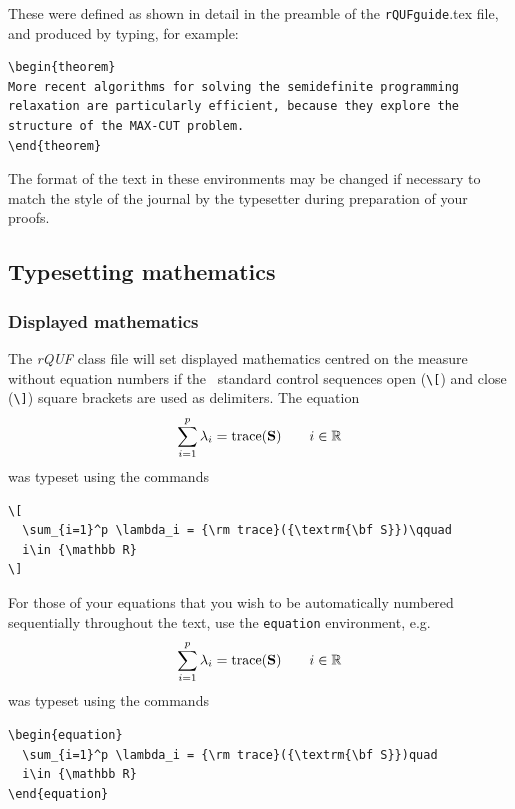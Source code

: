 \documentclass{rQUF2e}
\theoremstyle{plain}
\newtheorem{theorem}{Theorem}[section]
\theoremstyle{definition}
\theoremstyle{remark}
\begin{document}
\noindent These were defined as shown in detail in the preamble of the \texttt{rQUFguide}.tex file, and produced by typing, for example:
\begin{verbatim}
\begin{theorem}
More recent algorithms for solving the semidefinite programming
relaxation are particularly efficient, because they explore the
structure of the MAX-CUT problem.
\end{theorem}
\end{verbatim}
The format of the text in these environments may be changed if necessary to match the style of the journal by the typesetter during preparation of your proofs.


\subsection{Typesetting mathematics}\label{TMth}

\subsubsection{Displayed mathematics}

The \textit{rQUF} class file will set displayed mathematics centred on the measure without equation numbers if the \LaTeXe\ standard control
sequences open (\verb"\[") and close (\verb"\]") square brackets are used as delimiters. The equation
\[
  \sum_{i=1}^p \lambda_i = {\rm trace}({\textrm{\bf S}})\qquad
  i\in {\mathbb R}
\]
\normalfont was typeset using the commands
\begin{verbatim}
\[
  \sum_{i=1}^p \lambda_i = {\rm trace}({\textrm{\bf S}})\qquad
  i\in {\mathbb R}
\]
\end{verbatim}

For those of your equations that you wish to be automatically numbered sequentially throughout the text, use the \texttt{equation}
environment, e.g.
\begin{equation}
  \sum_{i=1}^p \lambda_i = {\rm trace}({\textrm{\bf S}})\qquad
  i\in {\mathbb R}
\end{equation}
was typeset using the commands
\begin{verbatim}
\begin{equation}
  \sum_{i=1}^p \lambda_i = {\rm trace}({\textrm{\bf S}})quad
  i\in {\mathbb R}
\end{equation}
\end{verbatim}
\end{document}
